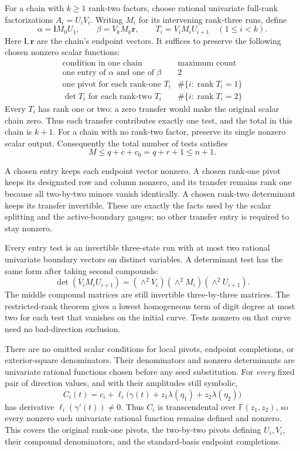 \documentclass[11pt]{article}
\newcommand{\F}{\mathbb F}
\begin{document}
For a chain with \(k\ge1\) rank-two factors, choose rational
univariate full-rank factorizations \(A_i=U_iV_i\).
Writing \(M_i\) for its intervening rank-three runs, define
\[
 \alpha=\mathbf lM_0U_1,\qquad
 \beta=V_kM_k\mathbf r,\qquad
 T_i=V_iM_iU_{i+1}\quad(1\le i<k).
\]
Here \(\mathbf l,\mathbf r\) are the chain's endpoint vectors.
It suffices to preserve the following chosen nonzero scalar functions:
\[
\begin{array}{c|c}
\text{condition in one chain}&\text{maximum count}\\ \hline
\text{one entry of }\alpha\text{ and one of }\beta&2\\
\text{one pivot for each rank-one }T_i&
 \#\{i:\operatorname{rank}T_i=1\}\\
\det T_i\text{ for each rank-two }T_i&
 \#\{i:\operatorname{rank}T_i=2\}
\end{array}
\]
Every \(T_i\) has rank one or two: a zero transfer would make the
original scalar chain zero. Thus each transfer contributes exactly
one test, and the total in this chain is \(k+1\).
For a chain with no rank-two factor, preserve its single nonzero
scalar output.
Consequently the total number of tests satisfies
\begin{equation}\label{eq:counttests}
 M\le q+c+c_0=q+r+1\le n+1.
\end{equation}

A chosen entry keeps each endpoint vector nonzero.
A chosen rank-one pivot keeps its designated row and column nonzero,
and its transfer remains rank one because all two-by-two minors
vanish identically. A chosen rank-two determinant keeps its transfer
invertible. These are exactly the facts used by the scalar splitting
and the active-boundary gauges; no other transfer entry is required
to stay nonzero.

Every entry test is an invertible three-state run with at most two
rational univariate boundary vectors on distinct variables.
A determinant test has the same form after taking second compounds:
\[
 \det(V_iM_iU_{i+1})
   =(\wedge^2V_i)(\wedge^2M_i)(\wedge^2U_{i+1}).
\]
The middle compound matrices are still invertible three-by-three
matrices. The restricted-rank theorem gives a lowest homogeneous
term of digit degree at most two for each test that vanishes on
the initial curve. Tests nonzero on that curve need no bad-direction
exclusion.

There are no omitted scalar conditions for local pivots, endpoint
completions, or exterior-square denominators.
Their denominators and nonzero determinants are univariate rational
functions chosen before any seed substitution.
For \emph{every} fixed pair of direction values, and with their
amplitudes still symbolic,
\[
 C_i(t)=c_i+\ell_i\bigl(\gamma(t)+
 z_1\lambda(\eta_1)+z_2\lambda(\eta_2)\bigr)
\]
has derivative \(\ell_i(\gamma'(t))\ne0\).
Thus \(C_i\) is transcendental over \(\F(z_1,z_2)\), so every
nonzero such univariate rational function remains defined and
nonzero. This covers the original rank-one pivots, the two-by-two
pivots defining \(U_i,V_i\), their compound denominators, and the
standard-basis endpoint completions.
\end{document}

